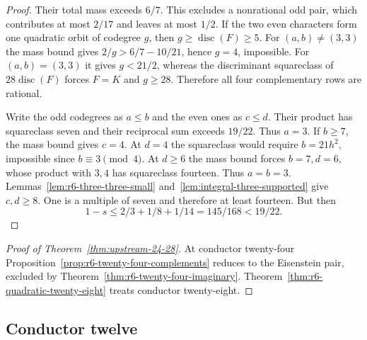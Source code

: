 \documentclass[11pt,reqno]{amsart}
\theoremstyle{remark}\newtheorem{remark}[theorem]{Remark}
\numberwithin{equation}{section}
\begin{document}
\begin{proof}
Their total mass exceeds $6/7$. This excludes a nonrational odd pair,
which contributes at most $2/17$ and leaves at most $1/2$.
If the two even characters form one quadratic orbit of codegree $g$,
then $g\ge\operatorname{disc}(F)\ge5$. For $(a,b)\ne(3,3)$ the
mass bound gives $2/g>6/7-10/21$, hence $g=4$, impossible. For
$(a,b)=(3,3)$ it gives $g<21/2$, whereas the discriminant squareclass
of $28\operatorname{disc}(F)$ forces $F=K$ and $g\ge28$.
Therefore all four complementary rows are rational.

Write the odd codegrees as $a\le b$ and the even ones as $c\le d$.
Their product has squareclass seven and their reciprocal sum exceeds
$19/22$. Thus $a=3$. If $b\ge7$, the mass bound gives $c=4$.
At $d=4$ the squareclass would require $b=21h^2$, impossible since
$b\equiv3\pmod4$. At $d\ge6$ the mass bound forces $b=7,d=6$,
whose product with $3,4$ has squareclass fourteen.
Thus $a=b=3$. Lemmas~\ref{lem:r6-three-three-small}
and~\ref{lem:integral-three-supported} give $c,d\ge8$.
One is a multiple of seven and therefore at least fourteen. But then
\[
 1-s\le 2/3+1/8+1/14=145/168<19/22.
\]
\end{proof}

\begin{proof}[Proof of Theorem~\ref{thm:upstream-24-28}]
At conductor twenty-four Proposition~\ref{prop:r6-twenty-four-complements}
reduces to the Eisenstein pair, excluded by
Theorem~\ref{thm:r6-twenty-four-imaginary}.
Theorem~\ref{thm:r6-quadratic-twenty-eight} treats conductor twenty-eight.
\end{proof}

\subsection{Conductor twelve}
\end{document}
